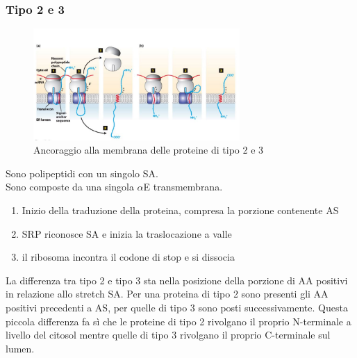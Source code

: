         \subsubsection{Tipo 2 e 3}
            \begin{figure}[h]
                \centering
                \includegraphics[width=0.7\textwidth]{images/Tipo23.JPG}
                \caption{\small Ancoraggio alla membrana delle proteine di tipo 2 e 3}
                \label{fig:mesh1}
            \end{figure}
            Sono polipeptidi con un singolo SA. \\
            Sono composte da una singola $\alpha$E transmembrana. 
            \begin{enumerate}
                \item Inizio della traduzione della proteina, compresa la porzione contenente AS
                \item SRP riconosce SA e inizia la traslocazione a valle
                \item il ribosoma incontra il codone di stop e si dissocia
            \end{enumerate}
            La differenza tra tipo 2 e tipo 3 sta nella posizione della porzione di AA positivi in relazione allo stretch SA. Per una proteina di tipo 2 sono presenti gli AA positivi precedenti a AS, per quelle di tipo 3 sono posti successivamente.
            Questa piccola differenza fa sì che le proteine di tipo 2 rivolgano il proprio N-terminale a livello del citosol mentre quelle di tipo 3 rivolgano il proprio C-terminale sul lumen.
        
